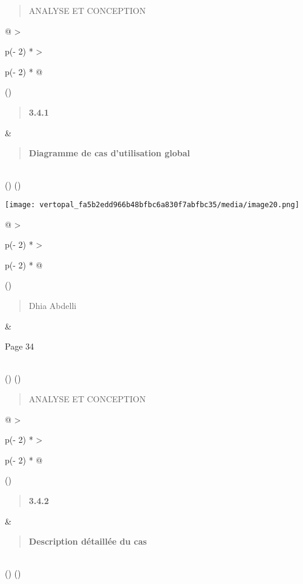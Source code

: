 \documentclass[
]{article}
\begin{document}
\begin{quote}
ANALYSE ET CONCEPTION
\end{quote}

\begin{longtable}[]{@{}
  >{\raggedright\arraybackslash}p{(\columnwidth - 2\tabcolsep) * }
  >{\raggedright\arraybackslash}p{(\columnwidth - 2\tabcolsep) * }@{}}
\toprule()
\begin{minipage}[b]{\linewidth}\raggedright
\begin{quote}
\textbf{3.4.1}
\end{quote}
\end{minipage} & \begin{minipage}[b]{\linewidth}\raggedright
\begin{quote}
\textbf{Diagramme de cas d'utilisation global}
\end{quote}
\end{minipage} \\
\midrule()
\endhead
\bottomrule()
\end{longtable}

\texttt{[image: vertopal\_fa5b2edd966b48bfbc6a830f7abfbc35/media/image20.png]}

\begin{longtable}[]{@{}
  >{\raggedright\arraybackslash}p{(\columnwidth - 2\tabcolsep) * }
  >{\raggedright\arraybackslash}p{(\columnwidth - 2\tabcolsep) * }@{}}
\toprule()
\begin{minipage}[b]{\linewidth}\raggedright
\begin{quote}
Dhia Abdelli
\end{quote}
\end{minipage} & \begin{minipage}[b]{\linewidth}\raggedright
Page 34
\end{minipage} \\
\midrule()
\endhead
\bottomrule()
\end{longtable}

\begin{quote}
ANALYSE ET CONCEPTION
\end{quote}

\begin{longtable}[]{@{}
  >{\raggedright\arraybackslash}p{(\columnwidth - 2\tabcolsep) * }
  >{\raggedright\arraybackslash}p{(\columnwidth - 2\tabcolsep) * }@{}}
\toprule()
\begin{minipage}[b]{\linewidth}\raggedright
\begin{quote}
\textbf{3.4.2}
\end{quote}
\end{minipage} & \begin{minipage}[b]{\linewidth}\raggedright
\begin{quote}
\textbf{Description détaillée du cas}
\end{quote}
\end{minipage} \\
\midrule()
\endhead
\bottomrule()
\end{longtable}
\end{document}
